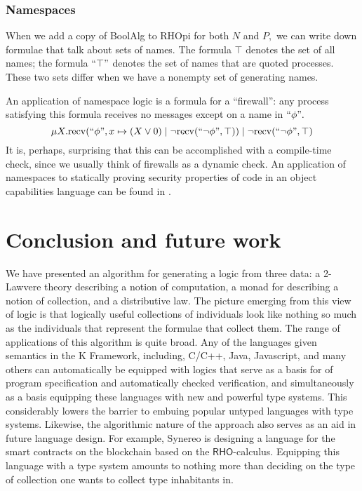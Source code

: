 \documentclass{llncs}
\newcommand{\recv}{\mathrm{recv}}
\renewcommand{\quote}[1]{``#1"}
\begin{document}
\subsubsection{Namespaces}

When we add a copy of BoolAlg to RHOpi for both $N$ and $P,$ we can write down formulae that talk about sets of names.  The formula $\top$ denotes the set of all names; the formula $\quote{\top}$ denotes the set of names that are quoted processes.  These two sets differ when we have a nonempty set of generating names.

An application of namespace logic is a formula for a ``firewall'': any process satisfying this formula receives no messages except on a name in $\quote{\phi}.$
\[ \mu X. \recv(\quote{\phi}, x \mapsto (X \lor 0)\;|\;\neg\recv(\quote{\neg \phi}, \top))\;|\;\neg\recv(\quote{\neg \phi}, \top) \]
It is, perhaps, surprising that this can be accomplished with a compile-time check, since we usually think of firewalls as a dynamic check.  An application of namespaces to statically proving security properties of code in an object capabilities language can be found in \cite{DBLP:journals/corr/MeredithSD13}.

\section{Conclusion and future work}
We have presented an algorithm for generating a logic from three data:
a 2-Lawvere theory describing a notion of computation, a monad for
describing a notion of collection, and a distributive law.  The picture
emerging from this view of logic is that logically useful
collections of individuals look like nothing so much as the
individuals that represent the formulae that collect them.  The range
of applications of this algorithm is quite broad.  Any of the languages
given semantics in the K Framework, including, C/C++, Java,
Javascript, and many others can automatically be equipped with logics
that serve as a basis for of program specification and automatically
checked verification, and simultaneously as a basis equipping these
languages with new and powerful type systems.  This considerably lowers
the barrier to embuing popular untyped languages with type
systems.  Likewise, the algorithmic nature of the approach also serves as an aid
in future language design.  For example, Synereo is designing a
language for the smart contracts on the blockchain based on the
$\mathsf{RHO}$-calculus.  Equipping this language with a type system
amounts to nothing more than deciding on the type of collection one
wants to collect type inhabitants in.



\end{document}
